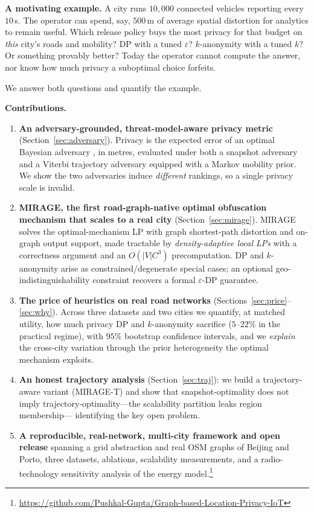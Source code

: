 \documentclass[10pt,journal,compsoc]{IEEEtran}
\begin{document}
\smallskip
\noindent\textbf{A motivating example.} A city runs $10{,}000$ connected vehicles
reporting every $10$\,s. The operator can spend, say, $500$\,m of average spatial
distortion for analytics to remain useful. Which release policy buys the most
privacy for that budget on \emph{this} city's roads and mobility? DP with a tuned
$\varepsilon$? $k$-anonymity with a tuned $k$? Or something provably better? Today
the operator cannot compute the answer, nor know how much privacy a suboptimal
choice forfeits.

\smallskip
We answer both questions and quantify the example.

\noindent\textbf{Contributions.}
\begin{enumerate}
\item \textbf{An adversary-grounded, threat-model-aware privacy metric}
(Section~\ref{sec:adversary}). Privacy is the expected error of an optimal
Bayesian adversary \cite{shokri2011}, in metres, evaluated under both a snapshot
adversary and a Viterbi trajectory adversary equipped with a Markov mobility
prior. We show the two adversaries induce \emph{different} rankings, so a single
privacy scale is invalid.
\item \textbf{MIRAGE, the first road-graph-native optimal obfuscation mechanism
that scales to a real city} (Section~\ref{sec:mirage}). MIRAGE solves the
optimal-mechanism LP with graph shortest-path distortion and on-graph output
support, made tractable by \emph{density-adaptive local LPs} with a correctness
argument and an $O(|V|C^3)$ precomputation. DP and $k$-anonymity arise as
constrained/degenerate special cases; an optional geo-indistinguishability
constraint recovers a formal $\varepsilon$-DP guarantee.
\item \textbf{The price of heuristics on real road networks}
(Sections~\ref{sec:price}--\ref{sec:why}). Across three datasets and two cities we
quantify, at matched utility, how much privacy DP and $k$-anonymity sacrifice
($5\text{--}22\%$ in the practical regime), with $95\%$ bootstrap confidence
intervals, and we \emph{explain} the cross-city variation through the prior
heterogeneity the optimal mechanism exploits.
\item \textbf{An honest trajectory analysis} (Section~\ref{sec:traj}): we build a
trajectory-aware variant (MIRAGE-T) and show that snapshot-optimality does not
imply trajectory-optimality---the scalability partition leaks region membership---
identifying the key open problem.
\item \textbf{A reproducible, real-network, multi-city framework and open release}
spanning a grid abstraction and real OSM graphs of Beijing and Porto, three
datasets, ablations, scalability measurements, and a radio-technology sensitivity
analysis of the energy model.\footnote{\url{https://github.com/Pushkal-Gupta/Graph-based-Location-Privacy-IoT}}
\end{enumerate}
\end{document}
